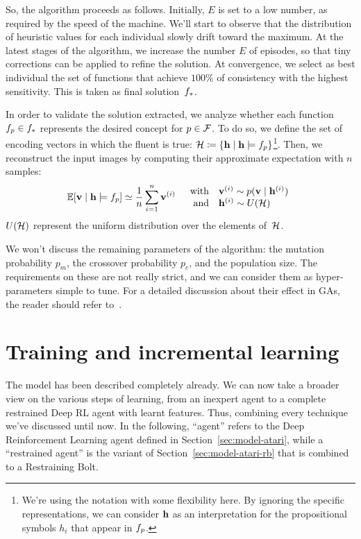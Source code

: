 So, the algorithm proceeds as follows. Initially, $E$ is set to a low number,
as required by the speed of the machine. We'll start to observe that the
distribution of heuristic values for each individual slowly drift toward the
maximum. At the latest stages of the algorithm, we increase the number $E$ of
episodes, so that tiny corrections can be applied to refine the solution.
At convergence, we select as best individual the set of functions that achieve
$100\%$ of consistency with the highest sensitivity. This is taken as final
solution~${f}_*$.

In order to validate the solution extracted, we analyze whether each function
$f_p \in {f}_*$ represents the desired concept for $p \in
\mathcal{F}$. To do so, we define the set of encoding vectors in which the fluent
is true: $\mathcal{H} \coloneqq \{ \mathbf{h} \mid \mathbf{h} \models f_p
\}$\footnote{We're using the notation with some flexibility here. By ignoring
the specific representations, we can consider $\mathbf{h}$ as an interpretation for
the propositional symbols $h_i$ that appear in $f_p$.}.  Then, we
reconstruct the input images by computing their approximate expectation with
$n$ samples:
\begin{equation}
	\mathbb{E}[\mathbf{v} \mid \mathbf{h} \models f_p] \simeq 
		\frac{1}{n} \sum_{i=1}^n \mathbf{v}^{(i)} \quad
		\begin{array}{rl}
			\text{with} & 
			\mathbf{v}^{(i)} \sim p(\mathbf{v} \mid \mathbf{h}^{(i)}) \\
			\text{and} & 
			\mathbf{h}^{(i)} \sim U(\mathcal{H}) \\
		\end{array}
\end{equation}
$U(\mathcal{H})$ represent the uniform distribution over the elements
of~$\mathcal{H}$.

We won't discuss the remaining parameters of the algorithm: the mutation
probability $p_m$, the crossover probability $p_c$, and the population size.
The requirements on these are not really strict, and we can consider them as
hyper-parameters simple to tune. For a detailed discussion about their effect
in GAs, the reader should refer to~\cite{bib:ga-mutations-review}.


\section{Training and incremental learning}

The model has been described completely already. We can now take a broader
view on the various steps of learning, from an inexpert agent to a complete
restrained Deep RL agent with learnt features. Thus, combining every technique
we've discussed until now. In the following, ``agent'' refers to the Deep
Reinforcement Learning agent defined in Section~\ref{sec:model-atari}, while a
``restrained agent'' is the variant of Section~\ref{sec:model-atari-rb} that
is combined to a Restraining Bolt.

